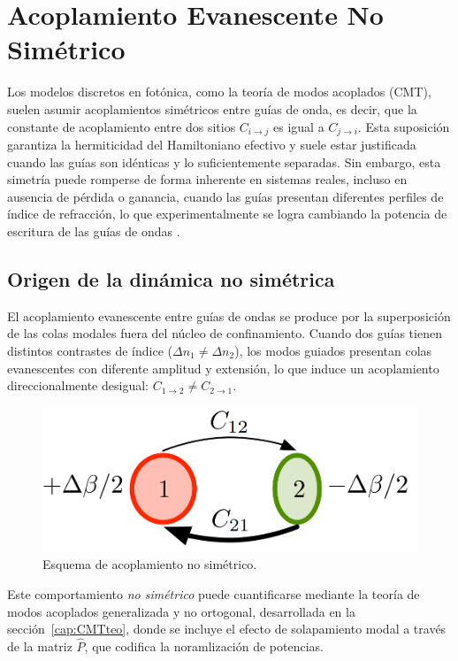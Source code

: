 \chapter{Acoplamiento Evanescente No Simétrico}
\label{cap:asymmetric}

Los modelos discretos en fotónica, como la teoría de modos acoplados (CMT), suelen asumir acoplamientos simétricos entre guías de onda, es decir, que la constante de acoplamiento entre dos sitios \( C_{i \to j} \) es igual a \( C_{j \to i} \). Esta suposición garantiza la hermiticidad del Hamiltoniano efectivo y suele estar justificada cuando las guías son idénticas y lo suficientemente separadas. Sin embargo, esta simetría puede romperse de forma inherente en sistemas reales, incluso en ausencia de pérdida o ganancia, cuando las guías presentan diferentes perfiles de índice de refracción, lo que experimentalmente se logra cambiando la potencia de escritura de las guías de ondas \cite{nonsymm}.

\section{Origen de la dinámica no simétrica}

El acoplamiento evanescente entre guías de ondas se produce por la superposición de las colas modales fuera del núcleo de confinamiento. Cuando dos guías tienen distintos contrastes de índice (\( \Delta n_1 \ne \Delta n_2 \)), los modos guiados presentan colas evanescentes con diferente amplitud y extensión, lo que induce un acoplamiento direccionalmente desigual: \( C_{1 \to 2} \ne C_{2 \to 1} \).
\begin{figure}[H]
	\centering
	\includegraphics[width=0.4\linewidth]{media/nonsympaper}
	\caption{Esquema de acoplamiento no simétrico.}
\end{figure}
Este comportamiento \textit{no simétrico} puede cuantificarse mediante la teoría de modos acoplados generalizada y no ortogonal, desarrollada en la sección~\ref{cap:CMTteo}, donde se incluye el efecto de solapamiento modal a través de la matriz \( \hat{P} \), que codifica la noramlización de potencias.

